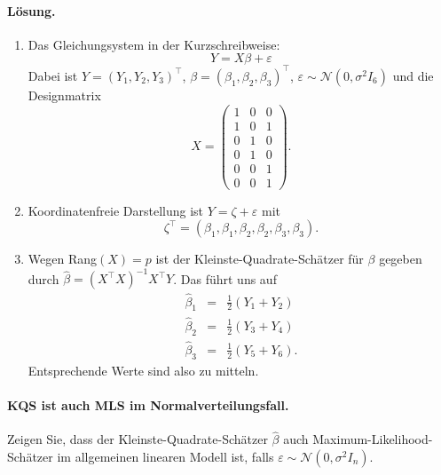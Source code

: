 \paragraph*{Lösung.}
\begin{enumerate}

    \item Das Gleichungsystem in der Kurzschreibweise:
        \begin{equation*}
            Y = X \beta + \varepsilon
        \end{equation*}
        Dabei ist $Y= \left( Y_1,Y_2,Y_3 \right)^\top$, $\beta = \left( \beta_1,\beta_2,\beta_3 \right)^\top$,
        $\varepsilon \sim\mathcal N\left( 0, \sigma^2 I_6 \right)$
        und die Designmatrix
        \begin{equation*}
            X = \left( {\begin{array}{ccc} 1&0&0\\ 1&0&1\\ 0&1&0\\ 0&1&0\\ 0&0&1\\ 0&0&1 \end{array}   } \right).
        \end{equation*}

    \item Koordinatenfreie Darstellung ist $Y = \zeta + \varepsilon$ mit 
        \begin{equation*}
            \zeta^\top = \left( \beta_1,\beta_1,\beta_2,\beta_2,\beta_3,\beta_3 \right).
        \end{equation*}

    \item Wegen Rang$(X)=p$ ist der Kleinste-Quadrate-Schätzer für $\beta$ gegeben durch 
        $\hat \beta = \left( X^\top X \right)^{-1} X^\top Y$. Das führt uns auf 
        \begin{eqnarray*}
            \hat\beta_1 &=&  \frac{1}{2} \left( Y_1+Y_2 \right)    \\
            \hat\beta_2 &=&  \frac{1}{2} \left( Y_3+Y_4 \right)    \\
            \hat\beta_3 &=&  \frac{1}{2} \left( Y_5+Y_6 \right).
        \end{eqnarray*}
        Entsprechende Werte sind also zu mitteln.

\end{enumerate}



\paragraph{KQS ist auch MLS im Normalverteilungsfall. }
Zeigen Sie, dass der Kleinste-Quadrate-Schätzer $\hat \beta$ auch Maximum-Likelihood-Schätzer 
im allgemeinen linearen Modell ist, falls $\varepsilon \sim \mathcal N(0, \sigma^2 I_n)$.

